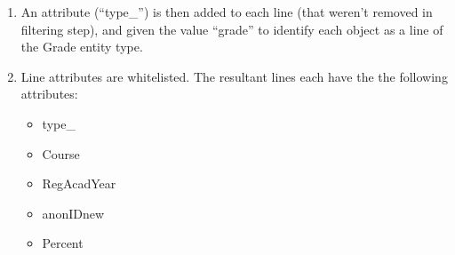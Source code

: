 \begin{enumerate}
    \item An attribute (``type\_'') is then added to each line (that weren't removed in filtering step), and given the value ``grade'' to identify each object as a line of the Grade entity type.
    \item Line attributes are whitelisted. The resultant lines each have the the following attributes:
          \begin{itemize}
              \item type\_
              \item Course
              \item RegAcadYear
              \item anonIDnew
              \item Percent
          \end{itemize}
\end{enumerate}

